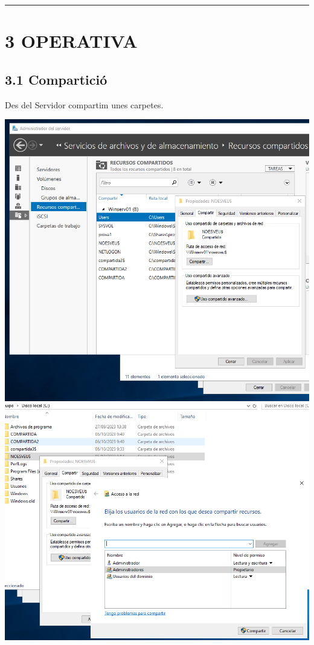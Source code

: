 \documentclass[
  a4paper,
]{article}
\begin{document}
\begin{center}\rule{0.5\linewidth}{0.5pt}\end{center}

\section{3 OPERATIVA}\label{operativa}

\subsection{3.1 Compartició}\label{comparticiuxf3}

Des del Servidor compartim unes carpetes.

\includegraphics{png/CarpetesCompartides1.png}
\includegraphics{png/CarpetesCompartides2.png}
\end{document}
